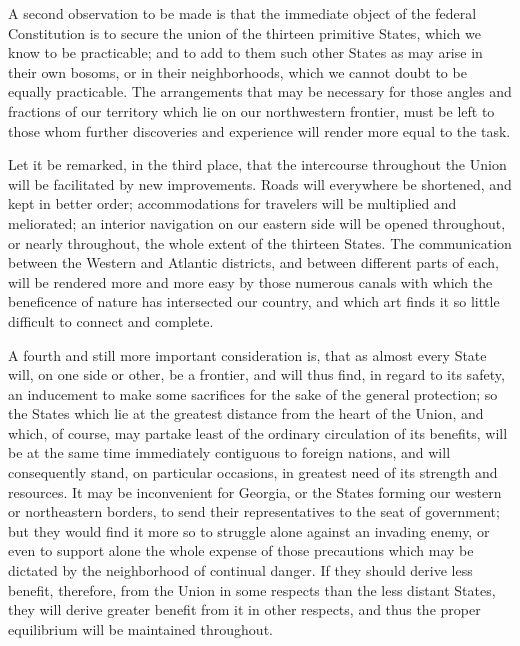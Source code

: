 A second observation to be made is that the immediate object of the federal Constitution is to secure the union of the thirteen primitive States, which we know to be practicable; and to add to them such other States as may arise in their own bosoms, or in their neighborhoods, which we cannot doubt to be equally practicable. 
The arrangements that may be necessary for those angles and fractions of our territory which lie on our northwestern frontier, must be left to those whom further discoveries and experience will render more equal to the task.

Let it be remarked, in the third place, that the intercourse throughout the Union will be facilitated by new improvements. 
Roads will everywhere be shortened, and kept in better order; accommodations for travelers will be multiplied and meliorated; an interior navigation on our eastern side will be opened throughout, or nearly throughout, the whole extent of the thirteen States. 
The communication between the Western and Atlantic districts, and between different parts of each, will be rendered more and more easy by those numerous canals with which the beneficence of nature has intersected our country, and which art finds it so little difficult to connect and complete.

A fourth and still more important consideration is, that as almost every State will, on one side or other, be a frontier, and will thus find, in regard to its safety, an inducement to make some sacrifices for the sake of the general protection; so the States which lie at the greatest distance from the heart of the Union, and which, of course, may partake least of the ordinary circulation of its benefits, will be at the same time immediately contiguous to foreign nations, and will consequently stand, on particular occasions, in greatest need of its strength and resources. 
It may be inconvenient for Georgia, or the States forming our western or northeastern borders, to send their representatives to the seat of government; but they would find it more so to struggle alone against an invading enemy, or even to support alone the whole expense of those precautions which may be dictated by the neighborhood of continual danger. 
If they should derive less benefit, therefore, from the Union in some respects than the less distant States, they will derive greater benefit from it in other respects, and thus the proper equilibrium will be maintained throughout.

